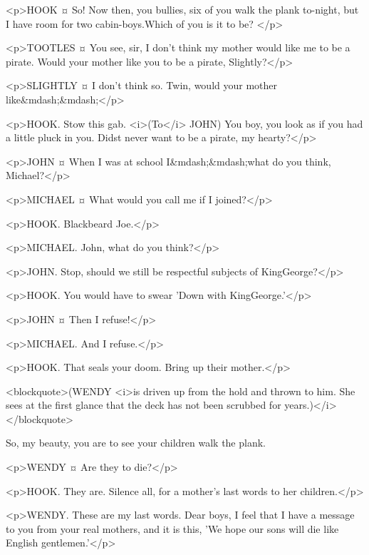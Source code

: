 <p>HOOK ¤
So! Now then, you bullies, six of you walk the plank to-night, but I have room for two cabin-boys.Which of you is it to be?
</p>

<p>TOOTLES ¤
You see, sir, I don't think my mother would like me to be a pirate. Would your mother like you to be a pirate, Slightly?</p>

<p>SLIGHTLY ¤
I don't think so. Twin, would your mother like&mdash;&mdash;</p>

<p>HOOK. Stow this gab. <i>(To</i> JOHN) You boy, you look as if you had a little pluck in you. Didst never want to be a pirate, my hearty?</p>

<p>JOHN ¤
When I was at school I&mdash;&mdash;what do you think, Michael?</p>

<p>MICHAEL ¤
What would you call me if I joined?</p>

<p>HOOK. Blackbeard Joe.</p>

<p>MICHAEL. John, what do you think?</p>

<p>JOHN. Stop, should we still be respectful subjects of KingGeorge?</p>

<p>HOOK. You would have to swear 'Down with KingGeorge.'</p>

<p>JOHN ¤
Then I refuse!</p>

<p>MICHAEL. And I refuse.</p>

<p>HOOK. That seals your doom. Bring up their mother.</p>

<blockquote>(WENDY <i>is driven up from the hold and thrown to him. She sees at the first glance that the deck has not been scrubbed for years.)</i></blockquote>

So, my beauty, you are to see your children walk the plank. 

<p>WENDY ¤
Are they to die?</p>

<p>HOOK. They are. Silence all, for a mother's last words to her children.</p>

<p>WENDY. These are my last words. Dear boys, I feel that I have a message to you from your real mothers, and it is this, 'We hope our sons will die like English gentlemen.'</p>


